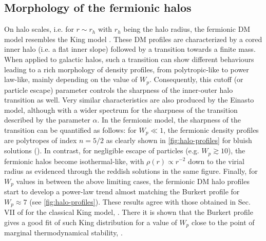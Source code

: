 \subsection{Morphology of the fermionic halos}
\label{sec:morph}


On halo scales, i.e. for $r \sim r_h$ with $r_h$ being the halo radius, the fermionic DM model resembles the King model \citep{1966AJ.....71...64K}. These DM profiles are characterized by a cored inner halo (i.e. a flat inner slope) followed by a transition towards a finite mass. When applied to galactic halos, such a transition can show different behaviours leading to a rich morphology of density profiles, from polytropic-like to power law-like, mainly depending on the value of $W_p$. Consequently, this cutoff (or particle escape) parameter controls the sharpness of the inner-outer halo transition as well. Very similar characteristics are also produced by the Einasto model, although with a wider spectrum for the sharpness of the transition described by the parameter $\alpha$. In the fermionic model, the sharpness of the transition can be quantified as follows: for $W_p\ll 1$, the fermionic density profiles are polytropes of index $n=5/2$ as clearly shown in \cref{fig:halo-profiles} for bluish solutions (). In contrast, for negligible escape of particles (e.g. $W_p \gtrsim 10$), the fermionic halos become isothermal-like, with $\rho(r) \propto r^{-2}$ down to the virial radius as evidenced through the reddish solutions in the same figure. Finally, for $W_p$ values in between the above limiting cases, the fermionic DM halo profiles start to develop a power-law trend almost matching the Burkert profile for $W_p\approx 7$ (see \cref{fig:halo-profiles}). 
These results agree with those obtained in Sec. VII of \citet{2015PhRvD..91f3531C} for the classical King model, . There it is shown that the Burkert profile gives a good fit of such King distribution for a value of $W_p$ close to the point of marginal thermodynamical stability, .

